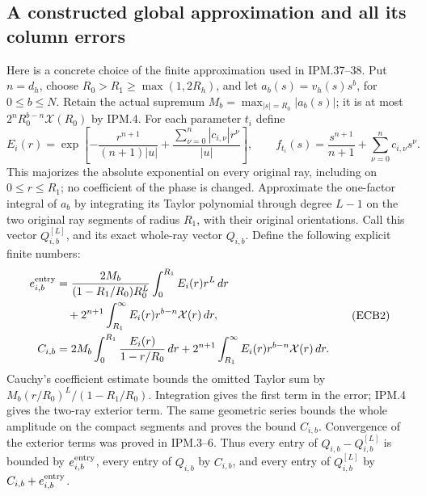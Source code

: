 \documentclass[11pt,a4paper]{article}
\theoremstyle{definition}
\begin{document}


\subsection{A constructed global approximation and all its column errors}

Here is a concrete choice of the finite approximation used in IPM.37--38.
Put \(n=d_h\), choose \(R_0>R_1\ge\max(1,2R_h)\), and let
\(a_b(s)=v_h(s)s^b\), for \(0\le b\le N\).
Retain the actual supremum \(M_b=\max_{|s|=R_0}|a_b(s)|\);
it is at most \(2^n R_0^{b-n}\mathcal X(R_0)\) by IPM.4.
For each parameter \(t_i\) define
\[
 E_i(r)=\exp\left[
 -\frac{r^{n+1}}{(n+1)|u|}
 +\frac{\sum_{\nu=0}^n|c_{i,\nu}|r^\nu}{|u|}\right],
 \qquad
 f_{t_i}(s)=\frac{s^{n+1}}{n+1}
                    +\sum_{\nu=0}^nc_{i,\nu}s^\nu .
 \tag{ECB1}
\]
This majorizes the absolute exponential on every original ray,
including on \(0\le r\le R_1\); no coefficient of the phase is
changed. Approximate the one-factor integral of \(a_b\) by integrating
its Taylor polynomial through degree \(L-1\) on the two original ray
segments of radius \(R_1\), with their original orientations.
Call this vector \(Q_{i,b}^{[L]}\), and its exact whole-ray vector
\(Q_{i,b}\). Define the following explicit finite numbers:
\[
\begin{split}
 e_{i,b}^{\rm entry}
 &=\frac{2M_b}{(1-R_1/R_0)R_0^L}
                      \int_0^{R_1} E_i(r)r^L\,dr\\
 &\quad+2^{n+1}\int_{R_1}^\infty
                      E_i(r)r^{b-n}\mathcal X(r)\,dr,\\
 C_{i,b}
 &=2M_b\int_0^{R_1}\frac{E_i(r)}{1-r/R_0}\,dr
       +2^{n+1}\int_{R_1}^\infty
                      E_i(r)r^{b-n}\mathcal X(r)\,dr .
\end{split}\tag{ECB2}
\]
Cauchy's coefficient estimate bounds the omitted Taylor sum by
\(M_b(r/R_0)^L/(1-R_1/R_0)\).
Integration gives the first term in the error; IPM.4 gives the
two-ray exterior term. The same geometric series bounds the whole
amplitude on the compact segments and proves the bound \(C_{i,b}\).
Convergence of the exterior terms was proved in IPM.3--6.
Thus every entry of \(Q_{i,b}-Q_{i,b}^{[L]}\) is bounded by
\(e_{i,b}^{\rm entry}\), every entry of \(Q_{i,b}\) by \(C_{i,b}\),
and every entry of \(Q_{i,b}^{[L]}\) by
\(C_{i,b}+e_{i,b}^{\rm entry}\).
\end{document}
